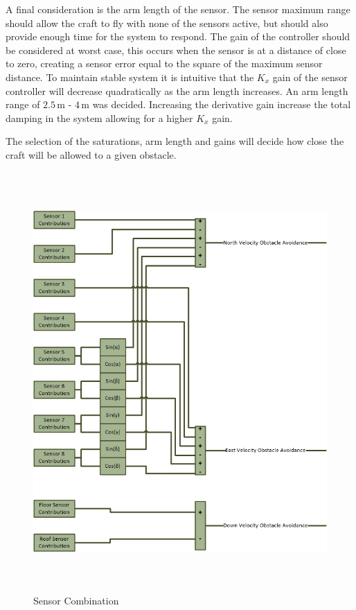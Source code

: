 			
			A final consideration is the arm length of the sensor. The sensor maximum range should allow the craft to fly with none of the sensors active, but should also provide enough time for the system to respond. The gain of the controller should be considered at worst case, this occurs when the sensor is at a distance of close to zero, creating a sensor error equal to the square of the maximum sensor distance. To maintain stable system it is intuitive that the $K_x$ gain of the sensor controller will decrease quadratically as the arm length increases. An arm length range of $2.5$\,m - $4$\,m was decided. Increasing the derivative gain increase the total damping in the system allowing for a higher $K_x$ gain.
			
			The selection of the saturations, arm length and gains will decide how close the craft will be allowed to a given obstacle. 
			
			\begin{figure}[H]
				\centering
				\includegraphics[height = 16cm]{../References/Diagrams/SensorCombination.jpg}     
				\caption{Sensor Combination}
				\label{IM_SensorCombination}
			\end{figure}
			

